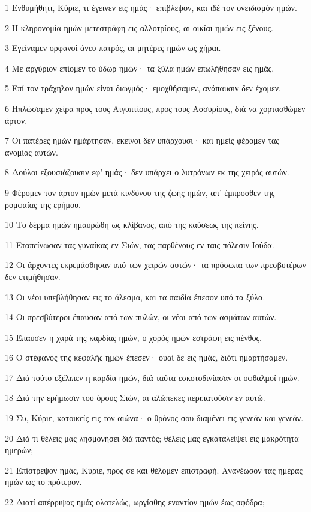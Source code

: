 \par 1 Ενθυμήθητι, Κύριε, τι έγεινεν εις ημάς· επίβλεψον, και ιδέ τον ονειδισμόν ημών.
\par 2 Η κληρονομία ημών μετεστράφη εις αλλοτρίους, αι οικίαι ημών εις ξένους.
\par 3 Εγείναμεν ορφανοί άνευ πατρός, αι μητέρες ημών ως χήραι.
\par 4 Με αργύριον επίομεν το ύδωρ ημών· τα ξύλα ημών επωλήθησαν εις ημάς.
\par 5 Επί τον τράχηλον ημών είναι διωγμός· εμοχθήσαμεν, ανάπαυσιν δεν έχομεν.
\par 6 Ηπλώσαμεν χείρα προς τους Αιγυπτίους, προς τους Ασσυρίους, διά να χορτασθώμεν άρτον.
\par 7 Οι πατέρες ημών ημάρτησαν, εκείνοι δεν υπάρχουσι· και ημείς φέρομεν τας ανομίας αυτών.
\par 8 Δούλοι εξουσιάζουσιν εφ' ημάς· δεν υπάρχει ο λυτρόνων εκ της χειρός αυτών.
\par 9 Φέρομεν τον άρτον ημών μετά κινδύνου της ζωής ημών, απ' έμπροσθεν της ρομφαίας της ερήμου.
\par 10 Το δέρμα ημών ημαυρώθη ως κλίβανος, από της καύσεως της πείνης.
\par 11 Εταπείνωσαν τας γυναίκας εν Σιών, τας παρθένους εν ταις πόλεσιν Ιούδα.
\par 12 Οι άρχοντες εκρεμάσθησαν υπό των χειρών αυτών· τα πρόσωπα των πρεσβυτέρων δεν ετιμήθησαν.
\par 13 Οι νέοι υπεβλήθησαν εις το άλεσμα, και τα παιδία έπεσον υπό τα ξύλα.
\par 14 Οι πρεσβύτεροι έπαυσαν από των πυλών, οι νέοι από των ασμάτων αυτών.
\par 15 Έπαυσεν η χαρά της καρδίας ημών, ο χορός ημών εστράφη εις πένθος.
\par 16 Ο στέφανος της κεφαλής ημών έπεσεν· ουαί δε εις ημάς, διότι ημαρτήσαμεν.
\par 17 Διά τούτο εξέλιπεν η καρδία ημών, διά ταύτα εσκοτοδινίασαν οι οφθαλμοί ημών.
\par 18 Διά την ερήμωσιν του όρους Σιών, αι αλώπεκες περιπατούσιν εν αυτώ.
\par 19 Συ, Κύριε, κατοικείς εις τον αιώνα· ο θρόνος σου διαμένει εις γενεάν και γενεάν.
\par 20 Διά τι θέλεις μας λησμονήσει διά παντός; θέλεις μας εγκαταλείψει εις μακρότητα ημερών;
\par 21 Επίστρεψον ημάς, Κύριε, προς σε και θέλομεν επιστραφή. Ανανέωσον τας ημέρας ημών ως το πρότερον.
\par 22 Διατί απέρριψας ημάς ολοτελώς, ωργίσθης εναντίον ημών έως σφόδρα;


